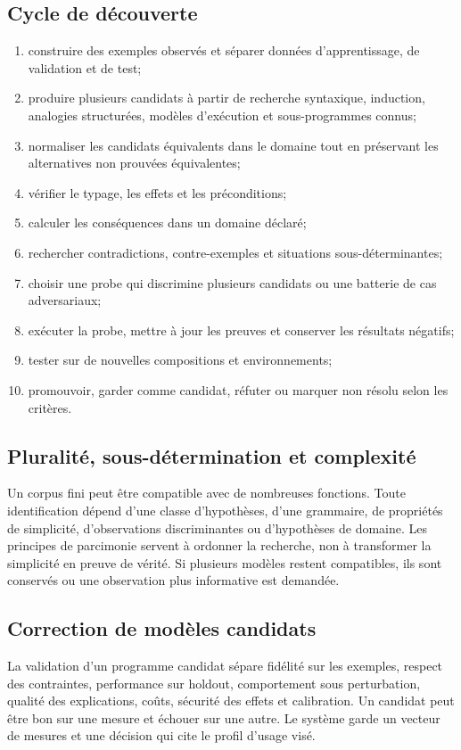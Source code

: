 \documentclass[11pt,a4paper]{article}
\begin{document}
\subsection{Cycle de découverte}
\begin{enumerate}
\item construire des exemples observés et séparer données d'apprentissage, de validation et de test;
\item produire plusieurs candidats à partir de recherche syntaxique, induction, analogies structurées, modèles d'exécution et sous-programmes connus;
\item normaliser les candidats équivalents dans le domaine tout en préservant les alternatives non prouvées équivalentes;
\item vérifier le typage, les effets et les préconditions;
\item calculer les conséquences dans un domaine déclaré;
\item rechercher contradictions, contre-exemples et situations sous-déterminantes;
\item choisir une probe qui discrimine plusieurs candidats ou une batterie de cas adversariaux;
\item exécuter la probe, mettre à jour les preuves et conserver les résultats négatifs;
\item tester sur de nouvelles compositions et environnements;
\item promouvoir, garder comme candidat, réfuter ou marquer non résolu selon les critères.
\end{enumerate}

\subsection{Pluralité, sous-détermination et complexité}
Un corpus fini peut être compatible avec de nombreuses fonctions. Toute identification dépend d'une classe d'hypothèses, d'une grammaire, de propriétés de simplicité, d'observations discriminantes ou d'hypothèses de domaine. Les principes de parcimonie servent à ordonner la recherche, non à transformer la simplicité en preuve de vérité. Si plusieurs modèles restent compatibles, ils sont conservés ou une observation plus informative est demandée.

\subsection{Correction de modèles candidats}
La validation d'un programme candidat sépare fidélité sur les exemples, respect des contraintes, performance sur holdout, comportement sous perturbation, qualité des explications, coûts, sécurité des effets et calibration. Un candidat peut être bon sur une mesure et échouer sur une autre. Le système garde un vecteur de mesures et une décision qui cite le profil d'usage visé.
\end{document}
